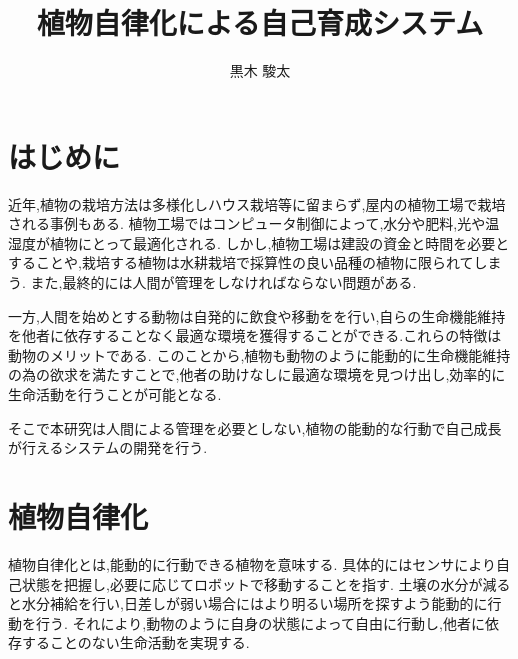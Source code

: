 \documentclass[10pt]{jsarticle}
\begin{document}
\pagestyle{empty}

\setlength{\baselineskip}{13truept}

\title{植物自律化による自己育成システム}
\author{黒木 駿太}

\maketitle
\thispagestyle{empty}

\section{はじめに}
近年,植物の栽培方法は多様化しハウス栽培等に留まらず,屋内の植物工場で栽培される事例もある.
植物工場ではコンピュータ制御によって,水分や肥料,光や温湿度が植物にとって最適化される.
しかし,植物工場は建設の資金と時間を必要とすることや,栽培する植物は水耕栽培で採算性の良い品種の植物に限られてしまう.
また,最終的には人間が管理をしなければならない問題がある\cite{Paper01}.

一方,人間を始めとする動物は自発的に飲食や移動をを行い,自らの生命機能維持を他者に依存することなく最適な環境を獲得することができる.これらの特徴は動物のメリットである.
このことから,植物も動物のように能動的に生命機能維持の為の欲求を満たすことで,他者の助けなしに最適な環境を見つけ出し,効率的に生命活動を行うことが可能となる.

そこで本研究は人間による管理を必要としない,植物の能動的な行動で自己成長が行えるシステムの開発を行う.

\section{植物自律化}
植物自律化とは,能動的に行動できる植物を意味する.
具体的にはセンサにより自己状態を把握し,必要に応じてロボットで移動することを指す.
土壌の水分が減ると水分補給を行い,日差しが弱い場合にはより明るい場所を探すよう能動的に行動を行う.
それにより,動物のように自身の状態によって自由に行動し,他者に依存することのない生命活動を実現する.
\end{document}
